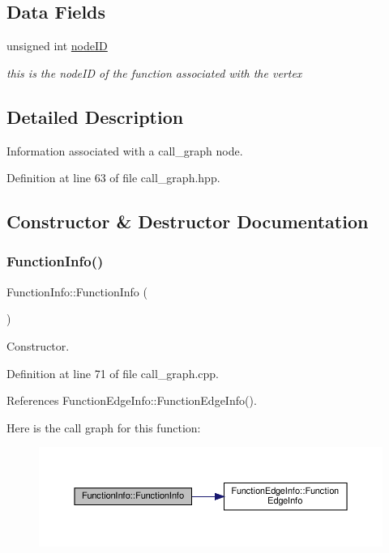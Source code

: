 \subsection*{Data Fields}
\begin{DoxyCompactItemize}
\item 
unsigned int \hyperlink{structFunctionInfo_a9aecdf5eb4f1a16921ed8459eda0f97f}{node\+ID}
\begin{DoxyCompactList}\small\item\em this is the node\+ID of the function associated with the vertex \end{DoxyCompactList}\end{DoxyCompactItemize}


\subsection{Detailed Description}
Information associated with a call\+\_\+graph node. 

Definition at line 63 of file call\+\_\+graph.\+hpp.



\subsection{Constructor \& Destructor Documentation}
\mbox{\label{structFunctionInfo_a94835d2fc06ddb449f84735069843170}} 
\subsubsection{\texorpdfstring{Function\+Info()}{FunctionInfo()}}
{\footnotesize\ttfamily Function\+Info\+::\+Function\+Info (\begin{DoxyParamCaption}{ }\end{DoxyParamCaption})}



Constructor. 



Definition at line 71 of file call\+\_\+graph.\+cpp.



References Function\+Edge\+Info\+::\+Function\+Edge\+Info().

Here is the call graph for this function\+:
\nopagebreak
\begin{figure}[H]
\begin{center}
\leavevmode
\includegraphics[width=350pt]{d0/d55/structFunctionInfo_a94835d2fc06ddb449f84735069843170_cgraph}
\end{center}
\end{figure}



